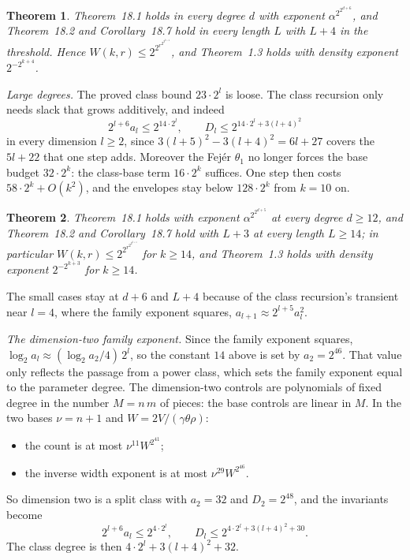 \documentclass[11pt]{article}
\newtheorem{theorem}{Theorem}
\theoremstyle{definition}
\theoremstyle{remark}
\begin{document}
\begin{theorem}\label{thm:fejer}
Theorem~18.1 holds in every degree $d$ with exponent $\alpha^{2^{2^{d+6}}}$, and
Theorem~18.2 and Corollary~18.7 hold in every length $L$ with $L+4$ in the
threshold. Hence $W(k,r)\le2^{2^{r^{2^{2^{k+4}}}}}$, and Theorem~1.3 holds with
density exponent $2^{-2^{k+4}}$.
\end{theorem}

\emph{Large degrees.} The proved class bound $23\cdot2^l$ is loose. The class
recursion only needs slack that grows additively, and indeed
\[
  2^{l+6}a_l\le2^{14\cdot2^l},\qquad D_l\le2^{14\cdot2^l+3(l+4)^2}
\]
in every dimension $l\ge2$, since $3(l+5)^2-3(l+4)^2=6l+27$ covers the
$5l+22$ that one step adds. Moreover the Fej\'er $\theta_1$ no longer
forces the base budget $32\cdot2^k$: the class-base term $16\cdot2^k$
suffices. One step then costs $58\cdot2^k+O(k^2)$, and the envelopes stay
below $128\cdot2^k$ from $k=10$ on.

\begin{theorem}\label{thm:fejer5}
Theorem~18.1 holds with exponent $\alpha^{2^{2^{d+5}}}$ at every degree
$d\ge12$, and Theorem~18.2 and Corollary~18.7 hold with $L+3$ at every
length $L\ge14$; in particular $W(k,r)\le2^{2^{r^{2^{2^{k+3}}}}}$ for $k\ge14$,
and Theorem~1.3 holds with density exponent $2^{-2^{k+3}}$ for $k\ge14$.
\end{theorem}

The small cases stay at $d+6$ and $L+4$ because of the class recursion's
transient near $l=4$, where the family exponent squares,
$a_{l+1}\approx2^{l+5}a_l^2$.

\emph{The dimension-two family exponent.} Since the family exponent squares,
$\log_2a_l\approx(\log_2a_2/4)\,2^l$, so the constant $14$ above is set by
$a_2=2^{46}$. That value only reflects the passage from a power class, which
sets the family exponent equal to the parameter degree. The dimension-two
controls are polynomials of fixed degree in the number $M=n\,m$ of pieces:
the base controls are linear in $M$. In the two bases $\nu=n+1$ and
$W=2V/(\gamma\theta\rho)$:
\begin{itemize}
\item the count is at most $\nu^{11}W^{2^{41}}$;
\item the inverse width exponent is at most $\nu^{29}W^{2^{46}}$.
\end{itemize}
So dimension two is a split class with $a_2=32$ and $D_2=2^{48}$, and the
invariants become
\[
  2^{l+6}a_l\le2^{4\cdot2^l},\qquad D_l\le2^{4\cdot2^l+3(l+4)^2+30}.
\]
The class degree is then $4\cdot2^l+3(l+4)^2+32$.
\end{document}
